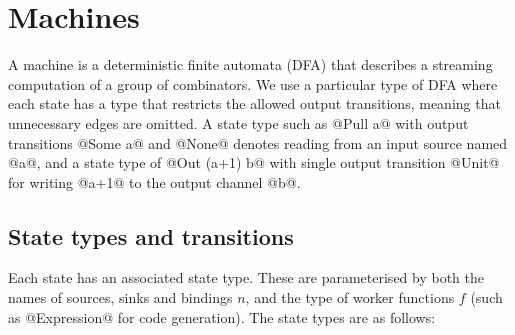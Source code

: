 \section{Machines}
\label{s:Machines}

A machine is a deterministic finite automata (DFA) that describes a streaming computation of a group of combinators.
We use a particular type of DFA where each state has a type that restricts the allowed output transitions, meaning that unnecessary edges are omitted.
A state type such as @Pull a@ with output transitions @Some a@ and @None@ denotes reading from an input source named @a@, and a state type of @Out (a+1) b@ with single output transition @Unit@ for writing @a+1@ to the output channel @b@.

\subsection{State types and transitions}
Each state has an associated state type.
These are parameterised by both the names of sources, sinks and bindings $n$, and the type of worker functions $f$ (such as @Expression@ for code generation).
The state types are as follows:

